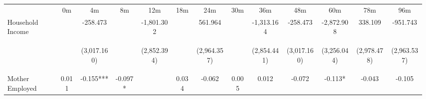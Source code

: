 \begin{tabular}{lcccccccccccc}
\hline \noalign{\smallskip} & 0m & 4m & 8m & 12m & 18m & 24m & 30m & 36m & 48m & 60m & 78m & 96m\\
\noalign{\smallskip}\hline \noalign{\smallskip}Household Income &  & -258.473 &  & -1,801.302 &  & 561.964 &  & -1,313.164 & -258.473 & -2,872.908 & 338.109 & -951.743\\
 & \begin{footnotesize}\end{footnotesize} & \begin{footnotesize}(3,017.160)\end{footnotesize} & \begin{footnotesize}\end{footnotesize} & \begin{footnotesize}(2,852.394)\end{footnotesize} & \begin{footnotesize}\end{footnotesize} & \begin{footnotesize}(2,964.357)\end{footnotesize} & \begin{footnotesize}\end{footnotesize} & \begin{footnotesize}(2,854.441)\end{footnotesize} & \begin{footnotesize}(3,017.160)\end{footnotesize} & \begin{footnotesize}(3,256.044)\end{footnotesize} & \begin{footnotesize}(2,978.478)\end{footnotesize} & \begin{footnotesize}(2,963.537)\end{footnotesize}\\
\noalign{\smallskip}Mother Employed & 0.011 & -0.155*** & -0.097* &  & 0.034 & -0.062 & 0.005 & 0.012 & -0.072 & -0.113* & -0.043 & -0.105\\

\end{tabular}
